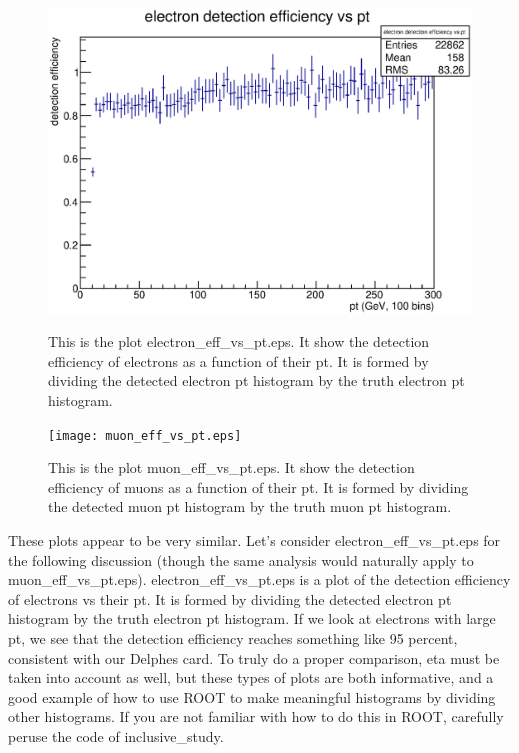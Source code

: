 \documentclass{article}
\begin{document}
\begin{figure}[!htbp]
\end{figure}

\begin{figure}[!htbp]
\begin{minipage}{0.45\textwidth}
	\centering
	\includegraphics[width = \linewidth]{electron_eff_vs_pt.eps}
	\caption{This is the plot electron\_eff\_vs\_pt.eps. It show the detection efficiency of electrons as a function of their pt. It is formed by dividing the detected electron pt histogram by the truth electron pt histogram.}
	\label{fig:electronEffvsPT}
\end{minipage}
\hspace{0.1\textwidth}
\begin{minipage}{0.45\textwidth}
	\centering
	\texttt{[image: muon\_eff\_vs\_pt.eps]}
	\caption{This is the plot muon\_eff\_vs\_pt.eps. It show the detection efficiency of muons as a function of their pt. It is formed by dividing the detected muon pt histogram by the truth muon pt histogram.}
	\label{fig:muonEffvsPT}
\end{minipage}
\end{figure}

\bigskip

These plots appear to be very similar. Let's consider electron\_eff\_vs\_pt.eps for the following discussion
(though the same analysis would naturally apply to muon\_eff\_vs\_pt.eps).
electron\_eff\_vs\_pt.eps is a plot of the detection efficiency of electrons vs their pt. It is formed by dividing
the detected electron pt histogram by the truth electron pt histogram. If we look at electrons with large
pt, we see that the detection efficiency reaches something like 95 percent, consistent with our Delphes
card. To truly do a proper comparison, eta must be taken into account as well, but these types of plots
are both informative, and a good example of how to use ROOT to make meaningful histograms by dividing
other histograms. If you are not familiar with how to do this in ROOT, carefully peruse the code of
inclusive\_study.
\end{document}
